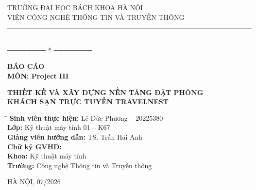 \documentclass[13pt,a4paper,twoside]{report}
\begin{document}
\thispagestyle{empty}
\begin{center}
  \vspace*{1cm}
  {\fontsize{13}{16}\selectfont TRƯỜNG ĐẠI HỌC BÁCH KHOA HÀ NỘI}\\[4pt]
  {\fontsize{13}{16}\selectfont VIỆN CÔNG NGHỆ THÔNG TIN VÀ TRUYỀN THÔNG}\\[4pt]
  \rule{\textwidth}{1pt}\\[4pt]
  {\fontsize{13}{16}\selectfont ──────── * ────────}

  \vspace{3cm}

  {\fontsize{18}{22}\bfseries BÁO CÁO}\\[8pt]
  {\fontsize{14}{18}\bfseries MÔN: Project III}

  \vspace{2cm}

  {\fontsize{16}{20}\bfseries\MakeUppercase{Thiết kế và xây dựng nền tảng đặt phòng}\\}
  {\fontsize{16}{20}\bfseries\MakeUppercase{khách sạn trực tuyến TravelNest}}

  \vspace{2.5cm}

  \begin{tabbing}
    \hspace{4cm}\= \kill
    \textbf{Sinh viên thực hiện:} \> Lê Đức Phương -- 20225380 \\[6pt]
    \textbf{Lớp:} \> Kỹ thuật máy tính 01 -- K67 \\[6pt]
    \textbf{Giảng viên hướng dẫn:} \> TS. Trần Hải Anh \\[6pt]
    \textbf{Chữ ký GVHD:} \> \hspace{3cm} \\[6pt]
    \textbf{Khoa:} \> Kỹ thuật máy tính \\[6pt]
    \textbf{Trường:} \> Công nghệ Thông tin và Truyền thông
  \end{tabbing}

  \vspace{3cm}

  {\fontsize{13}{16}\selectfont HÀ NỘI, 07/2026}
\end{center}

\newpage
\thispagestyle{empty}
\null
\newpage

\end{document}
